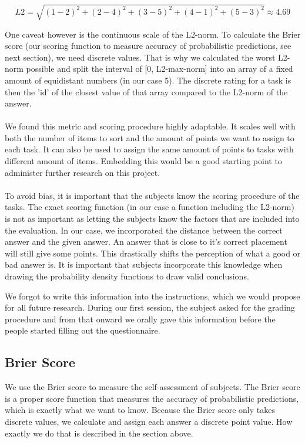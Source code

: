 \documentclass[../main/main.tex]{subfiles}
\begin{document}
	\begin{equation}
		\label{eq:l2}
		L2 = \sqrt{(1-2)^2 + (2-4)^2 + (3-5)^2 + (4-1)^2  + (5 - 3)^2} \approx 4.69
	\end{equation}
	
	One caveat however is the continuous scale of the L2-norm. To calculate the Brier score (our scoring function to measure accuracy of probabilistic predictions, see next section), we need discrete values. That is why we calculated the worst L2-norm possible and split the interval of [0, L2-max-norm] into an array of a fixed amount of equidistant numbers (in our case 5). The discrete rating for a task is then the 'id' of the closest value of that array compared to the L2-norm of the answer.
	\\\\
	We found this metric and scoring procedure highly adaptable. It scales well with both the number of items to sort and the amount of points we want to assign to each task. It can also be used to assign the same amount of points to tasks with different amount of items. Embedding this would be a good starting point to administer further research on this project.
	\\\\
	To avoid bias, it is important that the subjects know the scoring procedure of the tasks. The exact scoring function (in our case a function including the L2-norm) is not as important as letting the subjects know the factors that are included into the evaluation. In our case, we incorporated the distance between the correct answer and the given answer. An answer that is close to it's correct placement will still give some points. This drastically shifts the perception of what a good or bad answer is. It is important that subjects incorporate this knowledge when drawing the probability density functions to draw valid conclusions.
	
	We forgot to write this information into the instructions, which we would propose for all future research. During our first session, the subject asked for the grading procedure and from that onward we orally gave this information before the people started filling out the questionnaire.
	
	\subsection{Brier Score}
	\label{sec:brier_score}
	
	We use the Brier score to measure the self-assessment of subjects. The Brier score is a proper score function that measures the accuracy of probabilistic predictions, which is exactly what we want to know. Because the Brier score only takes discrete values, we calculate and assign each answer a discrete point value. How exactly we do that is described in the section above.
	
\end{document}
